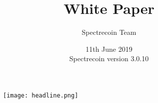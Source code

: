 \author{Spectrecoin Team}
\title{White Paper}
\date{11th June 2019\\
	Spectrecoin version 3.0.10}

\maketitle

\begin{figure}[h]
	\centering
	\texttt{[image: headline.png]}
\end{figure}